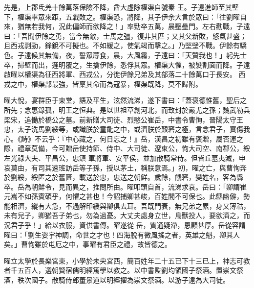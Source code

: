 \begin{pinyinscope}
 先是，上郡氐羌十餘萬落保險不降，酋大虛除權渠自號秦
 王。子遠進師至其壁下，權渠率眾來距，五戰敗之。權渠恐，將降，其子伊余大言於眾曰：「往劉曜自來，猶無若我何，況此偏師而欲降之！」率勁卒五萬，晨壓壘門。左右勸戰，子遠曰：「吾聞伊餘之勇，當今無敵，士馬之彊，復非其匹；又其父新敗，怒氣甚盛；且西戎剽勁，鋒銳不可擬也。不如緩之，使氣竭而擊之。」乃堅壁不戰。伊餘有驕色。子遠候其無備，夜，誓眾蓐食，晨，大風霧，子遠曰：「天贊我也！」躬先士卒，掃壁而出，遲明覆之，生擒伊餘，悉俘其眾。權渠大懼，被髮割面而降。子遠啟曜以權渠為征西將軍、西戎公，分徙伊餘兄弟及其部落二十餘萬口于長安。
 西戎之中，權渠部最強，皆稟其命而為寇暴，權渠既降，莫不歸附。



 曜大悅，宴群臣于東堂，語及平生，泫然流涕，遂下書曰：「蓋褒德惟舊，聖后之所先；念惠錄孤，明王之恒典。是以世祖草創河北，而致封於嚴尤之孫；魏武勒兵梁宋，追慟於橋公之墓。前新贈大司徒、烈愍公崔岳，中書令曹恂，晉陽太守王忠，太子洗馬劉綏等，或識朕於童齔之中，或濟朕於艱窘之極，言念君子，實傷我心。《詩》不云乎：『中心藏之，何日忘之！』岳，漢昌之初雖有褒贈，屬否運之際，禮章莫備，今可贈岳使持節、侍中、大司徒、遼東公，恂大司空、南郡公，綏左光祿大夫、平昌公，忠鎮
 軍將軍、安平侯，並加散騎常侍。但皆丘墓夷滅，申哀莫由，有司其速班訪岳等子孫，授以茅土，稱朕意焉。」初，曜之亡，與曹恂奔於劉綏，綏匿之於舊匱，載送於忠，忠送之朝鮮。歲餘，饑窘，變姓名，客為縣卒。岳為朝鮮令，見而異之，推問所由。曜叩頭自首，流涕求哀。岳曰：「卿謂崔元嵩不如孫賓碩乎，何懼之甚也！今詔捕卿甚峻，百姓間不可保也。此縣幽僻，勢能相濟，縱有大急，不過解印綬與卿俱去耳。吾既門衰，無兄弟之累，身又薄祜，未有兒子，卿猶吾子弟也，勿為過憂。大丈夫處身立世，鳥獸投人，要欲濟之，而況君子乎！」給以衣服，資供書傳。曜遂從
 岳，質通疑滯，恩顧甚厚。岳從容謂曜曰：「劉生姿宇神調，命世之才也！四海脫有微風搖之者，英雄之魁，卿其人矣。」曹恂雖於屯厄之中，事曜有君臣之禮，故皆德之。



 曜立太學於長樂宮東，小學於未央宮西，簡百姓年二十五已下十三已上，神志可教者千五百人，選朝賢宿儒明經篤學以教之。以中書監劉均領國子祭酒。置崇文祭酒，秩次國子。散騎侍郎董景道以明經擢為崇文祭酒。以游子遠為大司徒。




\end{pinyinscope}
